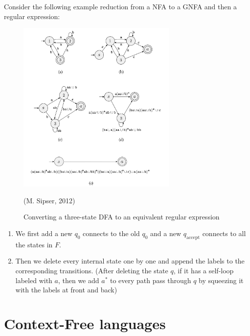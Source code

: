\begin{proofidea} Consider the following example reduction from a NFA to a GNFA and then a regular expression:
\begin{figure}[htbp] \centering
    \includegraphics[width=0.7\textwidth]{figures/4.PNG}
    \caption{Converting a three-state DFA to an equivalent regular expression} (M. Sipser, 2012)
\end{figure}
\begin{enumerate}
    \item We first add a new $q_0$ connects to the old $q_0$ and a new $q_\text{accept}$ connects to all the states in $F$.
    \item Then we delete every internal state one by one and append the labels to the corresponding transitions. (After deleting the state $q$, if it has a self-loop labeled with $a$, then we add $a^{*}$ to every path pass through $q$ by squeezing it with the labels at front and back)
\end{enumerate}
\end{proofidea}

\section{Context-Free languages} \label{sec:}
